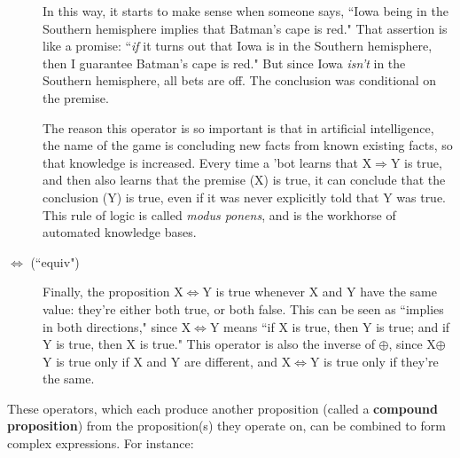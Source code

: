 \begin{description}
In this way, it starts to make sense when someone says, ``Iowa being in
the Southern hemisphere implies that Batman's cape is red." That assertion
is like a promise: ``\textit{if} it turns out that Iowa is in the Southern
hemisphere, then I guarantee Batman's cape is red." But since Iowa
\textit{isn't} in the Southern hemisphere, all bets are off. The
conclusion was conditional on the premise.

The reason this operator is so important is that in artificial
intelligence, the name of the game is concluding new facts from known
existing facts, so that knowledge is increased. Every time a 'bot learns
that X$\Rightarrow$Y is true, and then also learns that the premise (X) is
true, it can conclude that the conclusion (Y) is true, even if it was
never explicitly told that Y was true. This rule of logic is called
\textit{modus ponens}, and is the workhorse of automated knowledge bases.

\pagebreak
{}
\item[$\Leftrightarrow$ (``equiv")] Finally, the proposition
X$\Leftrightarrow$Y is true whenever X and Y have the same value: they're
either both true, or both false. This can be seen as ``implies in both
directions," since X$\Leftrightarrow$Y means ``if X is true, then Y is
true; and if Y is true, then X is true." This operator is also the inverse
of $\oplus$, since X$\oplus$Y is true only if X and Y are different, and
X$\Leftrightarrow$Y is true only if they're the same.

\end{description}

These operators, which each produce another proposition (called a
\textbf{compound proposition}) from the proposition(s) they operate on, can
be combined to form complex expressions. For instance:

